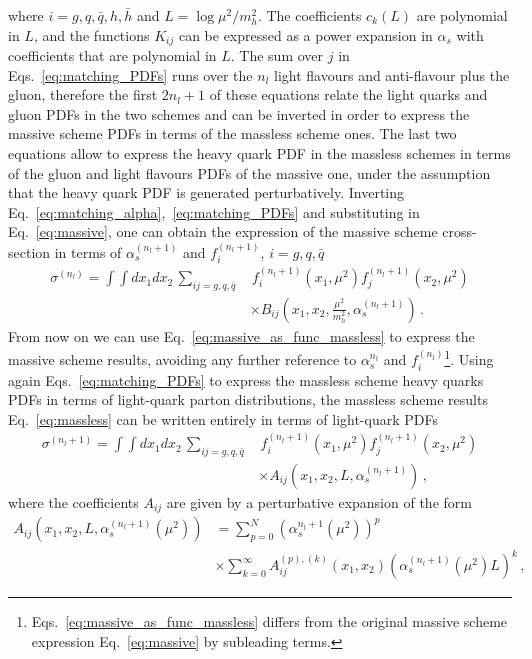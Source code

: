 where $i = g, q, \bar{q}, h, \bar{h}$ and $L = \log \mu^2/m_h^2$. The coefficients $c_k\left(L\right)$ are polynomial in $L$,
and the functions $K_{ij}$ can be expressed as a power expansion in $\alpha_s$ with coefficients
that are polynomial in $L$. The sum over $j$ in Eqs.~\ref{eq:matching_PDFs}
runs over the $n_l$ light flavours and anti-flavour plus the gluon, therefore the first $2n_l+1$
of these equations relate the light quarks and gluon PDFs in the two schemes and can be inverted in
order to express the massive scheme PDFs in terms of the massless scheme ones. The last two equations
allow to express the heavy quark PDF in the massless schemes in terms of the gluon and light flavours PDFs of the massive one,
under the assumption that the heavy quark PDF is generated perturbatively.
%
Inverting Eq.~\ref{eq:matching_alpha},~\ref{eq:matching_PDFs} and substituting in Eq.~\ref{eq:massive},
one can obtain the expression of the massive scheme cross-section in terms of $\alpha_s^{(n_l+1)}$
and $f_i^{(n_l+1)}$, $i = g,q,\bar{q}$
\begin{align}
    \label{eq:massive_as_func_massless}
    \sigma^{(n_l)} = \int \int dx_1 dx_2\, \sum_{ij = g,q,\bar{q} }&\, 
    f_i^{(n_l+1)}\left(x_1,\mu^2\right)f_j^{(n_l+1)}\left(x_2,\mu^2\right) \nonumber \\
    &\times B_{ij}\left(x_1,x_2,\frac{\mu^2}{m_h^2},\alpha_s^{(n_l+1)}\right)\,.
\end{align}
From now on we can use Eq.~\ref{eq:massive_as_func_massless} to express the massive scheme results, avoiding
any further reference to $\alpha_s^{n_l}$ and $f_i^{(n_l)}$\footnote{Eqs.~\ref{eq:massive_as_func_massless}
differs from the original massive scheme expression Eq.~\ref{eq:massive} by subleading terms.}.
Using again Eqs.~\ref{eq:matching_PDFs} to express the massless scheme heavy quarks PDFs in terms of light-quark parton
distributions, the massless scheme results Eq.~\ref{eq:massless} can be written entirely in terms of 
light-quark PDFs
\begin{align}
    \label{eq:massless_1}
    \sigma^{(n_l+1)} = \int \int dx_1 dx_2\, \sum_{ij=g,q,\bar{q}}&\, 
    f_i^{(n_l+1)}\left(x_1,\mu^2\right)f_j^{(n_l+1)}\left(x_2,\mu^2\right) \nonumber \\
    &\times A_{ij}\left(x_1,x_2,L,\alpha_s^{(n_l+1)}\right)\,,
\end{align}
where the coefficients $A_{ij}$ are given by a perturbative expansion of the form
\begin{align}
    \label{eq:expansionA}
    A_{ij}\left(x_1,x_2,L,\alpha_s^{(n_l+1)}\left(\mu^2\right)\right)&
    = \sum_{p=0}^N \left(\alpha_s^{n_l+1}\left(\mu^2\right)\right)^p \nonumber\\
    &\times\sum_{k=0}^{\infty} A_{ij}^{(p),(k)}\left(x_1,x_2\right)\left(\alpha_s^{(n_l+1)}\left(\mu^2\right)L\right)^k\,,
\end{align}
